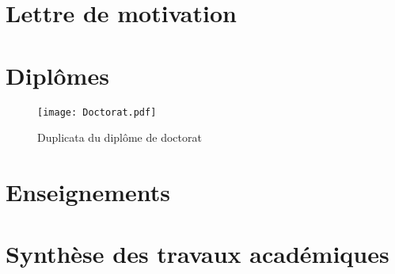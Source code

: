 \documentclass[a4paper, 11pt]{report}
\begin{document}
\chapter{{\color[RGB]{30,144,255} Lettre de motivation}}%



%
%
\chapter{{\color[RGB]{30,144,255} Dipl\^omes}}
\begin{figure}[ht]
\begin{center}
\texttt{[image: Doctorat.pdf]}
\caption{Duplicata du diplôme de doctorat}
\end{center}
\end{figure}


%
%
\chapter{{\color[RGB]{30,144,255} Enseignements}}


 
%
%
\chapter{{\color[RGB]{30,144,255} Synthèse des travaux académiques}}%

\end{document}
